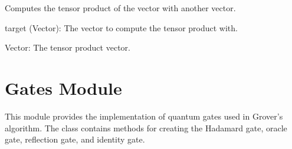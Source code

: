 \documentclass[letterpaper,10pt,english]{sphinxmanual}
\begin{document}
\begin{fulllineitems}
\begin{fulllineitems}
\label{\detokenize{index:utils.tensor.Vector.tensor}}
\pysigstartsignatures
{}
\pysigstopsignatures
\sphinxAtStartPar
Computes the tensor product of the vector with another vector.
\begin{description}
\sphinxAtStartPar
target (Vector): The vector to compute the tensor product with.

\sphinxAtStartPar
Vector: The tensor product vector.

\end{description}

\end{fulllineitems}


\end{fulllineitems}


\chapter{Gates Module}
\label{\detokenize{index:gates-module}}\label{\detokenize{index:module-gates}}
\sphinxAtStartPar
This module provides the implementation of quantum gates used in Grover’s algorithm.
The  class contains methods for creating the Hadamard gate, oracle gate,
reflection gate, and identity gate.
\end{document}
